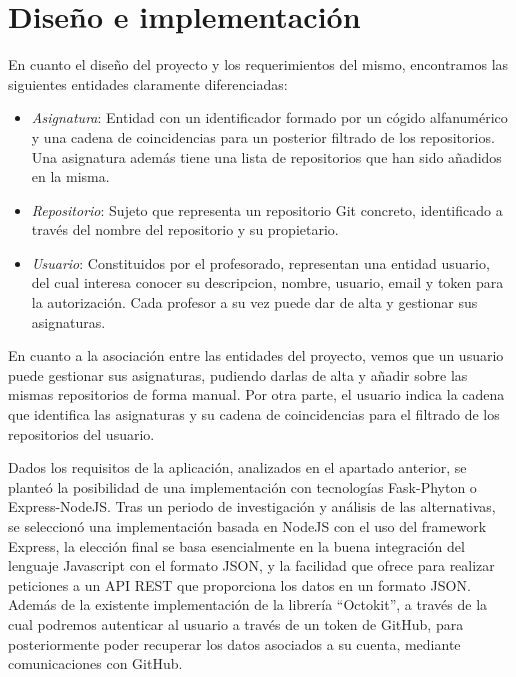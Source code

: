 \chapter{Diseño e implementación\label{05disenoTrabajo}}


En cuanto el diseño del proyecto y los requerimientos del mismo, encontramos las siguientes entidades claramente diferenciadas:
\begin{itemize}
  \item \emph{Asignatura}: Entidad con un identificador formado por un cógido alfanumérico y una cadena de coincidencias para un posterior filtrado de los repositorios. Una asignatura además tiene una lista de repositorios que han sido añadidos en la misma.
  \item \emph{Repositorio}: Sujeto que representa un repositorio Git concreto, identificado a través del nombre del repositorio y su propietario.
  \item \emph{Usuario}: Constituidos por el profesorado, representan una entidad usuario, del cual interesa conocer su descripcion, nombre, usuario, email y token para la autorización. Cada profesor a su vez puede dar de alta y gestionar sus asignaturas.
\end{itemize}

En cuanto a la asociación entre las entidades del proyecto, vemos que un usuario puede gestionar sus asignaturas, pudiendo darlas de alta y añadir sobre las mismas repositorios de forma manual. Por otra parte, el usuario indica la cadena que identifica las asignaturas y su cadena de coincidencias para el filtrado de los repositorios del usuario.

Dados los requisitos de la aplicación, analizados en el apartado anterior, se planteó la posibilidad de una implementación con tecnologías Fask-Phyton o Express-NodeJS. Tras un periodo de investigación y análisis de las alternativas, se seleccionó una implementación basada en NodeJS con el uso del framework Express, la elección final se basa esencialmente en la buena integración del
lenguaje Javascript con el formato JSON, y la facilidad que ofrece para
realizar peticiones a un API REST que proporciona los datos en un formato
JSON. Además de la existente implementación de la librería “Octokit”\cite{Octokit,OctokitDoc}, a través de la cual podremos autenticar al usuario a través de un token de GitHub, para posteriormente poder recuperar los datos asociados a su cuenta, mediante comunicaciones con GitHub.

